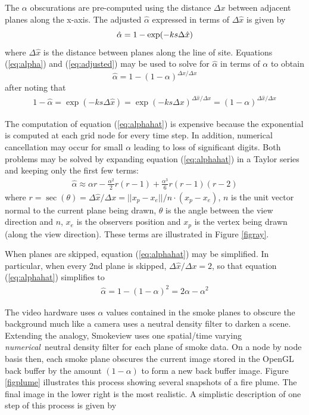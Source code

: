 The $\alpha$ obscurations are pre-computed using the distance
$\Delta x$ between adjacent planes along the x-axis. The adjusted
$\hat{\alpha}$ expressed in terms of $\Delta\hat{x}$ is given by
\begin{equation}
\label{eq:adjusted}
\hat{\alpha}=1-\exp(-ks\Delta \hat{x})\\
\end{equation}
where $\Delta\hat{x}$ is the distance between planes along the line of site.
Equations (\ref{eq:alpha}) and (\ref{eq:adjusted}) may be used to
solve for $\hat{\alpha}$ in terms of $\alpha$ to obtain
\begin{equation}
\label{eq:alphahat}
\hat{\alpha}=1-(1-\alpha)^{\Delta\hat{x}/\Delta x}
\end{equation}
after noting that
\begin{eqnarray*}
1-\hat{\alpha}=\exp(-ks\Delta\hat{x})=\exp(-ks\Delta
x)^{\Delta\hat{x}/\Delta x}=(1-\alpha)^{\Delta\hat{x}/\Delta x}
\end{eqnarray*}

The computation of equation (\ref{eq:alphahat}) is expensive
because the exponential is computed at each grid node for every
time step.  In addition, numerical cancellation may occur for
small $\alpha$ leading to loss of significant digits. Both
problems may be solved by expanding equation (\ref{eq:alphahat})
in a Taylor series and keeping only the first few terms:
\begin{eqnarray*}
\hat{\alpha}\approx \alpha r -
\frac{\alpha^2}{2}r(r-1)+\frac{\alpha^3}{6}r(r-1)(r-2)
\end{eqnarray*}
where $r=\sec(\theta)=\Delta \hat{x}/\Delta
x=||x_p-x_e||/n\cdot(x_p-x_e)$, $n$ is the unit vector normal to
the current plane being drawn, $\theta$ is the angle between the
view direction and $n$, $x_e$ is the observers position and $x_p$
is the vertex being drawn (along the view direction).  These terms
are illustrated in Figure \ref{figray}.

When planes are skipped, equation (\ref{eq:alphahat}) may be
simplified.  In particular, when every 2nd plane is skipped,
$\Delta\hat{x}/\Delta x=2$, so that equation (\ref{eq:alphahat})
simplifies to
\begin{eqnarray*}
\hat{\alpha}=1-(1-\alpha)^2=2\alpha-\alpha^2
\end{eqnarray*}

The video hardware uses $\alpha$ values contained in the smoke
planes to obscure the background much like a camera uses a neutral
density filter to darken a scene.  Extending the analogy,
Smokeview uses one spatial/time varying {\em numerical}\ neutral
density filter for each plane of smoke data.  On a node by node
basis then, each smoke plane obscures the current image stored in
the OpenGL back buffer by the amount $(1-\alpha)$ to form a new
back buffer image.  Figure \ref{figplume} illustrates this process
showing several snapshots of a fire plume. The final image in the
lower right is the most realistic. A simplistic description of one
step of this process is given by

